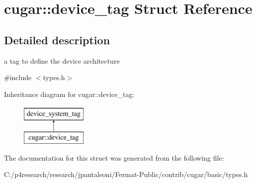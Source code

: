 \hypertarget{structcugar_1_1device__tag}{}\section{cugar\+:\+:device\+\_\+tag Struct Reference}
\label{structcugar_1_1device__tag}


\subsection{Detailed description}
a tag to define the device architecture 

{\ttfamily \#include $<$types.\+h$>$}

Inheritance diagram for cugar\+:\+:device\+\_\+tag\+:\begin{figure}[H]
\begin{center}
\leavevmode
\includegraphics[height=2.000000cm]{structcugar_1_1device__tag}
\end{center}
\end{figure}


The documentation for this struct was generated from the following file\+:\begin{DoxyCompactItemize}
\item 
C\+:/p4research/research/jpantaleoni/\+Fermat-\/\+Public/contrib/cugar/basic/types.\+h\end{DoxyCompactItemize}
